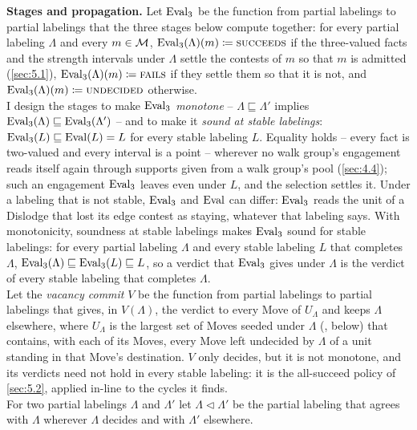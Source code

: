 \documentclass[12pt,a4paper]{article}
\begin{document}
\textbf{Stages and propagation.}
Let $\operatorname{Eval}_3$ be the function from partial labelings to partial labelings that the three stages below compute together: for every partial labeling $\Lambda$ and every $m \in \mathcal{M}$, $\operatorname{Eval}_3(\Lambda)(m) \coloneqq \textsc{succeeds}$ if the three-valued facts and the strength intervals under $\Lambda$ settle the contests of $m$ so that $m$ is admitted (\cref{sec:5.1}), $\operatorname{Eval}_3(\Lambda)(m) \coloneqq \textsc{fails}$ if they settle them so that it is not, and $\operatorname{Eval}_3(\Lambda)(m) \coloneqq \textsc{undecided}$ otherwise.\\
I design the stages to make $\operatorname{Eval}_3$ \emph{monotone} -- $\Lambda \sqsubseteq \Lambda'$ implies $\operatorname{Eval}_3(\Lambda) \sqsubseteq \operatorname{Eval}_3(\Lambda')$ -- and to make it \emph{sound at stable labelings}: $\operatorname{Eval}_3(L) \sqsubseteq \operatorname{Eval}(L) = L$ for every stable labeling $L$.
Equality holds -- every fact is two-valued and every interval is a point -- wherever no walk group's engagement reads itself again through supports given from a walk group's pool (\cref{sec:4.4}); such an engagement $\operatorname{Eval}_3$ leaves  even under $L$, and the selection settles it.
Under a labeling that is not stable, $\operatorname{Eval}_3$ and $\operatorname{Eval}$ can differ: $\operatorname{Eval}_3$ reads the unit of a Dislodge that lost its edge contest as staying, whatever that labeling says.
With monotonicity, soundness at stable labelings makes $\operatorname{Eval}_3$ sound for stable labelings: for every partial labeling $\Lambda$ and every stable labeling $L$ that completes $\Lambda$, $\operatorname{Eval}_3(\Lambda) \sqsubseteq \operatorname{Eval}_3(L) \sqsubseteq L$, so a verdict that $\operatorname{Eval}_3$ gives under $\Lambda$ is the verdict of every stable labeling that completes $\Lambda$.\\
Let the \emph{vacancy commit} $V$ be the function from partial labelings to partial labelings that gives, in $V(\Lambda)$, the verdict  to every Move of $U_\Lambda$ and keeps $\Lambda$ elsewhere, where $U_\Lambda$ is the largest set of Moves seeded under $\Lambda$ (, below) that contains, with each of its Moves, every Move left undecided by $\Lambda$ of a unit standing in that Move's destination.
$V$ only decides, but it is not monotone, and its verdicts need not hold in every stable labeling: it is the all-succeed policy of \cref{sec:5.2}, applied in-line to the cycles it finds.\\
For two partial labelings $\Lambda$ and $\Lambda'$ let $\Lambda \lhd \Lambda'$ be the partial labeling that agrees with $\Lambda$ wherever $\Lambda$ decides and with $\Lambda'$ elsewhere.\\
\end{document}
